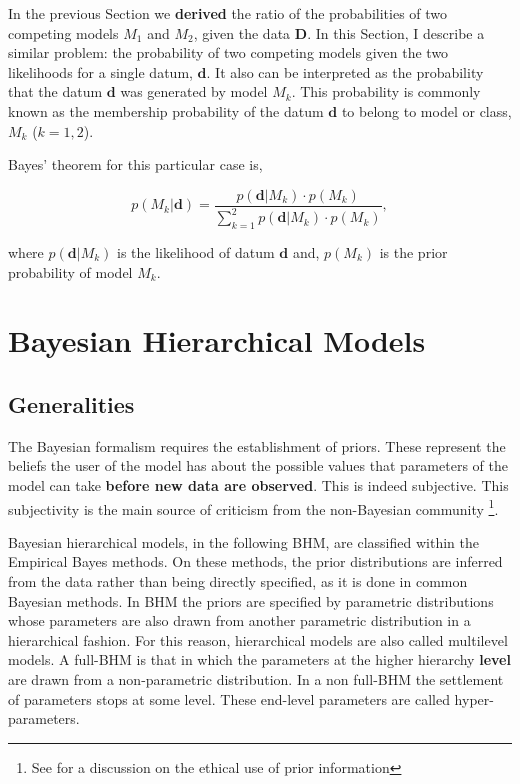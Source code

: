 In the previous Section we \textbf{derived} the ratio of the probabilities of two competing models $M_1$ and $M_2$, given the data $\mathbf{D}$. In this Section, I describe a similar problem: the probability of two competing models given the two likelihoods for a single datum, $\mathbf{d}$. It also can be interpreted as the probability that the datum $\mathbf{d}$ was generated by model $M_k$. This probability is commonly known as the membership probability of the datum $\mathbf{d}$ to belong to model or class, $M_k$ ($k=1,2$). 

Bayes' theorem for this particular case is,

\begin{equation}
\label{eq:prob}
p( M_k | \mathbf{d}) =\frac{p(\mathbf{d}|M_k)\cdot p(M_k)}{\sum_{k=1}^2 p(\mathbf{d}|M_k)\cdot p(M_k)},
\end{equation}

where $p(\mathbf{d}|M_k)$ is the likelihood of datum $\mathbf{d}$ and, $p(M_k)$ is the prior probability of model $M_k$.



\section{Bayesian Hierarchical Models}
\label{sect:BHM}
\subsection{Generalities}
\label{sect:generalities}
The Bayesian formalism requires the establishment of priors. These represent the beliefs the user of the model has about the possible values that parameters of the model can take \textbf{before new data are observed}. This is indeed subjective. This subjectivity is the main source of criticism from the non-Bayesian community \footnote{See \citet{Gelman2012} for a discussion on the ethical use of prior information}. 

Bayesian hierarchical models, in the following BHM, are classified within the Empirical Bayes methods. On these methods, the prior distributions are inferred from the data rather than being directly specified, as it is done in common Bayesian methods. In BHM the priors are specified by parametric distributions whose parameters are also drawn from another parametric distribution in a hierarchical fashion. For this reason, hierarchical models are also called multilevel models. A full-BHM is that in which the parameters at the higher hierarchy \textbf{level} are drawn from a non-parametric distribution. In a non full-BHM the settlement of parameters stops at some level. These end-level parameters are called hyper-parameters.

